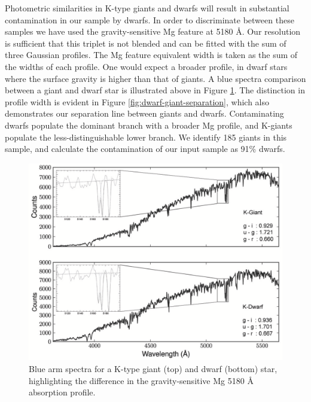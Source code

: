 \documentclass{emulateapj}
\begin{document}
	Photometric similarities in K-type giants and dwarfs will result in substantial contamination in our sample by dwarfs. In order to discriminate between these samples we have used the gravity-sensitive Mg feature at  5180 \AA. Our resolution is sufficient that this triplet is not blended and can be fitted with the sum of three Gaussian profiles. The Mg feature equivalent width is taken as the sum of the widths of each profile. One would expect a broader profile, in dwarf stars where the surface gravity is higher than that of giants. A blue spectra comparison between a giant and dwarf star is illustrated above in Figure \ref{fig:dwarf-giant-comparison}. The distinction in profile width is evident in Figure \ref{fig:dwarf-giant-separation}, which also demonstrates our separation line between giants and dwarfs. Contaminating dwarfs populate the dominant branch with a broader Mg profile, and K-giants populate the less-distinguishable lower branch. We identify 185 giants in this sample, and calculate the contamination of our input sample as 91\% dwarfs.
	
	\begin{figure}[t!]
	\centering
	\includegraphics[width=18.4cm]{./figures/spectra.eps}
	\caption{Blue arm spectra for a K-type giant (top) and dwarf (bottom) star, highlighting the difference in the gravity-sensitive Mg 5180 \AA\, absorption profile.}
	\label{fig:dwarf-giant-comparison}
\end{figure}
	
		
\end{document}

